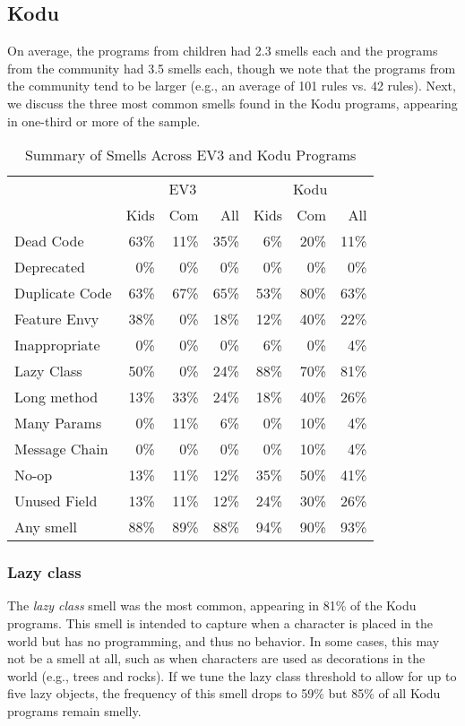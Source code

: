 \documentclass[conference]{IEEEtran}
\begin{document}
\subsection{Kodu}
On average, the programs from children had 2.3 smells each and the programs from the community had 3.5 smells each, though we note that the programs from the community tend to be larger (e.g., an average of 101 rules vs. 42 rules). Next, we discuss the three most common smells found in the Kodu programs, appearing in one-third or more of the sample. 



\begin{table}
\caption{Summary of Smells Across EV3 and Kodu Programs \label{tab:smellsummary}}
\begin{small}
\begin{center}
\begin{tabular}{| l || r r | r || r r | r||} \cline{2-7}
\multicolumn{1}{c||}{}&\multicolumn{3}{c||}{EV3}&\multicolumn{3}{c||}{Kodu}\\ \cline{2-7}
\multicolumn{1}{c||}{}& Kids & Com & All & Kids & Com & All \\ \hline
Dead Code&63\%&11\%&35\%&6\%&20\%&11\%\\
Deprecated  & 0\% & 0\%& 0\% & 0\%& 0\% & 0\%\\
Duplicate Code&63\%&67\%&65\%&53\%&80\%&63\%\\
Feature Envy&38\%&0\%&18\%&12\%&40\%&22\%\\
Inappropriate &0\%&0\%&0\%&6\%&0\%&4\%\\
Lazy Class&50\%&0\%&24\%&88\%&70\%&81\%\\
Long method&13\%&33\%&24\%&18\%&40\%&26\%\\
Many Params&0\%&11\%&6\%&0\%&10\%&4\%\\
Message Chain&0\%&0\%&0\%&0\%&10\%&4\%\\
No-op&13\%&11\%&12\%&35\%&50\%&41\%\\
Unused Field&13\%&11\%&12\%&24\%&30\%&26\%\\ \hline\hline
Any smell & 88\%&89\%&88\% & 94\%&90\%&93\% \\ \hline
\end{tabular}
\end{center}
\end{small}
\vspace{-12pt}
\end{table}

\subsubsection{Lazy class}
The \emph{lazy class} smell was the most common, appearing in 81\% of the Kodu programs. This smell is intended to capture when a character is placed in the world but has no programming, and thus no behavior. In some cases, this may not be a smell at all, such as when characters are used as decorations in the world (e.g., trees and rocks). If we tune the lazy class threshold to allow for up to five lazy objects, the frequency of this smell  drops to 59\% but 85\% of all Kodu programs remain smelly. 
\end{document}
